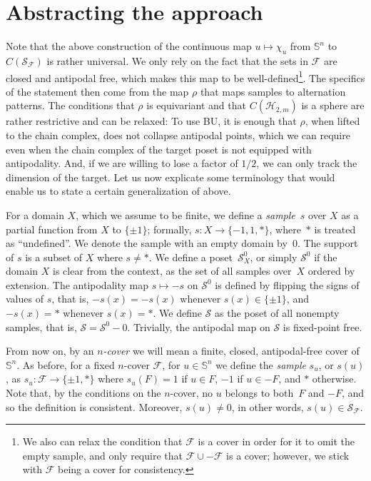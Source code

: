 \documentclass{article} %
\newcommand{\F}{\mathcal{F}}
\renewcommand{\H}{\mathcal{H}}
\renewcommand{\S}{\mathcal{S}}
\renewcommand{\SS}{\mathbb{S}}
\begin{document}
\section{Abstracting the approach}\label{sec-abstracting}


Note that the above construction of the continuous map $u\mapsto \chi_u$ from $\SS^n$ to $C(\S_\F)$ is rather universal. We only rely on the fact that the sets in $\F$ are closed and antipodal free, which makes this map to be well-defined\footnote{We also can relax the condition that $\F$ is a cover in order for it to omit the empty sample, and only require that $\F \cup -\F$ is a cover; however, we stick with $\F$ being a cover for consistency.}. 
The specifics of the statement then come from the map $\rho$ that maps samples to alternation patterns. The conditions that $\rho$ is equivariant and that $C(\H_{2, m})$ is a sphere are rather restrictive and can be relaxed: To use BU, it is enough that $\rho$, when lifted to the chain complex, does not collapse antipodal points, which we can require even when the chain complex of the target poset is not equipped with antipodality. And, if we are willing to lose a factor of $1/2$, we can only track the dimension of the target. Let us now explicate some terminology that would enable us to state a certain generalization of  above.

For a domain $X$, which we assume to be finite, we define a \emph{sample}~$s$ over $X$ as a partial function from $X$ to $\{\pm1\}$; formally, $s\colon X\rightarrow \{-1, 1, *\}$, where~$*$ is treated as ``undefined''. We denote the sample with an empty domain by~$0$. The support of $s$ is a subset of $X$ where $s\neq *$. We define a poset~$\S^0_X$, or simply $\S^0$ if the domain $X$ is clear from the context, as the set of all samples over~$X$ ordered by extension. The antipodality map $s\mapsto -s$ on $\S^0$ is defined by flipping the signs of values of $s$, that is, $-s(x) = -s(x)$ whenever $s(x)\in \{\pm1\}$, and $-s(x)=*$ whenever $s(x)=*$. We define $\S$ as the poset of all nonempty samples, that is, $\S = \S^0 - 0$. 
Trivially, the antipodal map on $\S$ is fixed-point free.

From now on, by an \emph{$n$-cover} we will mean a finite, closed, antipodal-free cover of $\SS^n$. As before, for a fixed $n$-cover $\F$, for $u\in \SS^n$ we define the \emph{sample} $s_u$, or $s(u)$, as $s_u \colon \F\rightarrow \{\pm1, *\}$ where $s_u(F) = 1$ if $u\in F$, $-1$ if $u\in -F$, and $*$ otherwise. Note that, by the conditions on the $n$-cover, no $u$ belongs to both~$F$ and $-F$, and so the definition is consistent. Moreover, $s(u)\neq 0$, in other words, $s(u)\in \S_\F$. 
\end{document}
